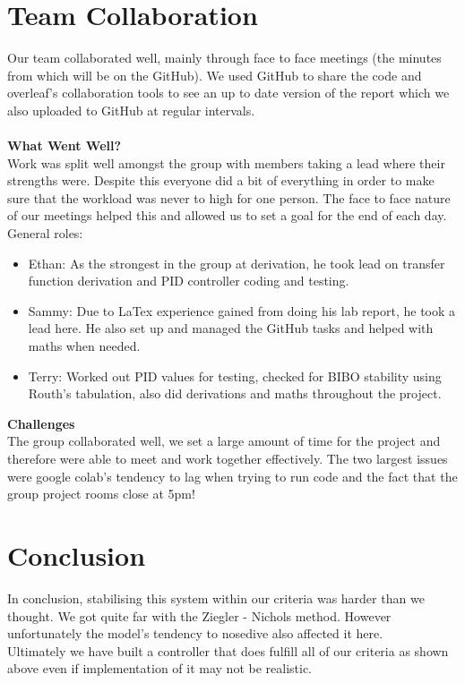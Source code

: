 \documentclass{article}
\numberwithin{equation}{section}
\begin{document}
\section{Team Collaboration}
Our team collaborated well, mainly through face to face meetings (the minutes from which will be on the GitHub). We used GitHub to share the code and overleaf's collaboration tools to see an up to date version of the report which we also uploaded to GitHub at regular intervals. \\\\
\textbf{What Went Well?}\\
Work was split well amongst the group with members taking a lead where their strengths were. Despite this everyone did a bit of everything in order to make sure that the workload was never to high for one person. The face to face nature of our meetings helped this and allowed us to set a goal for the end of each day.
General roles:
\begin{itemize}
    \item Ethan: As the strongest in the group at derivation, he took lead on transfer function derivation and PID controller coding and testing.
    \item Sammy: Due to LaTex experience gained from doing his lab report, he took a lead here. He also set up and managed the GitHub tasks and helped with maths when needed.
    \item Terry: Worked out PID values for testing, checked for BIBO stability using Routh's tabulation, also did derivations and maths throughout the project.
\end{itemize}
\textbf{Challenges}\\
The group collaborated well, we set a large amount of time for the project and therefore were able to meet and work together effectively. The two largest issues were google colab's tendency to lag when trying to run code and the fact that the group project rooms close at 5pm!

\newpage
\section{Conclusion}
In conclusion, stabilising this system within our criteria was harder than we thought. We got quite far with the Ziegler - Nichols method. However unfortunately the model's tendency to nosedive also affected it here.\\ 
Ultimately we have built a controller that does fulfill all of our criteria as shown above even if implementation of it may not be realistic.
\end{document}
